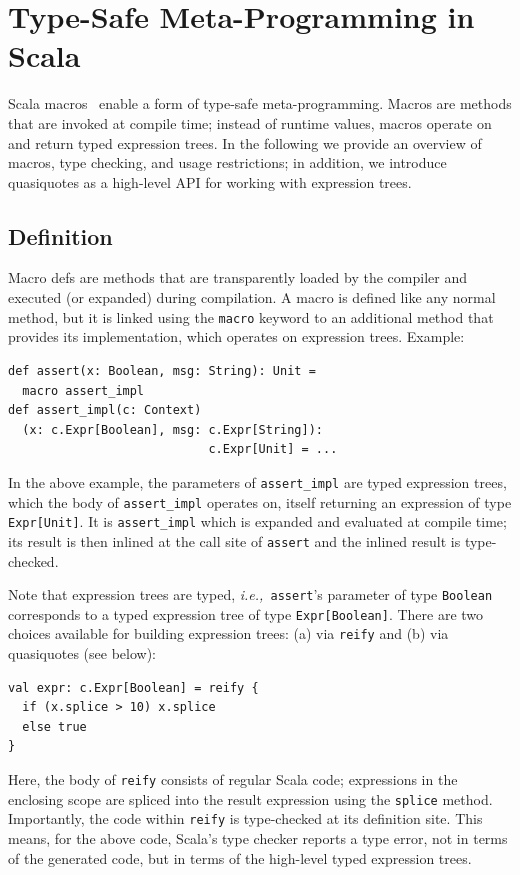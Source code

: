 \documentclass[preprint]{sigplanconf}
\newcommand{\ie}{{\em i.e.,~}}
\begin{document}
\section{Type-Safe Meta-Programming in Scala}
\label{sec:macros}

Scala macros~\cite{Burmako2012, Burmako2013} enable a form of type-safe
meta-programming. Macros are methods that are invoked at compile time; instead of
runtime values, macros operate on and return typed expression trees. In the
following we provide an overview of macros, type checking, and usage
restrictions; in addition, we introduce quasiquotes as a high-level API
for working with expression trees.

\subsection{Definition}

Macro defs are methods that are transparently loaded by
the compiler and executed (or expanded) during compilation. A macro is defined
like any normal method, but it is linked using the \verb|macro| keyword to an
additional method that provides its implementation, which operates on
expression trees. Example:
\begin{lstlisting}
def assert(x: Boolean, msg: String): Unit =
  macro assert_impl
def assert_impl(c: Context)
  (x: c.Expr[Boolean], msg: c.Expr[String]):
                            c.Expr[Unit] = ...
\end{lstlisting}
\noindent
In the above example, the parameters of \verb|assert_impl| are typed
expression trees, which the body of \verb|assert_impl| operates on, itself
returning an expression of type \verb|Expr[Unit]|. It is \verb|assert_impl|
which is expanded and evaluated at compile time; its result is then inlined at
the call site of \verb|assert| and the inlined result is type-checked.

Note that expression trees are typed, \ie \verb|assert|'s parameter of type
\verb|Boolean| corresponds to a typed expression tree of type
\verb|Expr[Boolean]|. There are two choices available for building expression
trees: (a) via \verb|reify| and (b) via quasiquotes (see below):
\begin{lstlisting}
val expr: c.Expr[Boolean] = reify {
  if (x.splice > 10) x.splice
  else true
}
\end{lstlisting}
\noindent
Here, the body of \verb|reify| consists of regular Scala code; expressions in
the enclosing scope are spliced into the result expression using the
\verb|splice| method. Importantly, the code within \verb|reify| is
type-checked at its definition site. This means, for the above code, Scala's type
checker reports a type error, not in terms of the generated code, but in terms
of the high-level typed expression trees.
\end{document}
